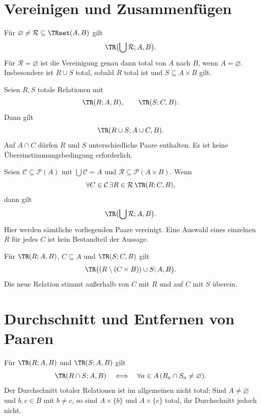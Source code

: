 \section{Vereinigen und Zusammenfügen}

\begin{theorem}
\label{b04guide:thm:union}
Für $\varnothing\ne\mathcal R\subseteq\TRset(A,B)$ gilt
\[
 \TR\bigl(\bigcup\mathcal R;A,B\bigr).
\]
Für $\mathcal R=\varnothing$ ist die Vereinigung genau dann
total von $A$ nach $B$, wenn $A=\varnothing$.
Insbesondere ist $R\cup S$ total, sobald $R$ total ist und
$S\subseteq A\times B$ gilt.
\end{theorem}

\begin{theorem}
\label{b04guide:thm:gluing}
Seien $R,S$ totale Relationen mit
\[
 \TR(R;A,B),\qquad \TR(S;C,B).
\]
Dann gilt
\[
 \TR(R\cup S;A\cup C,B).
\]
Auf $A\cap C$ dürfen $R$ und $S$ unterschiedliche Paare enthalten.
Es ist keine Übereinstimmungsbedingung erforderlich.
\end{theorem}

\begin{theorem}
\label{b04guide:thm:familyglue}
Seien $\mathcal C\subseteq\mathcal P(A)$ mit
$\bigcup\mathcal C=A$ und
$\mathcal R\subseteq\mathcal P(A\times B)$.
Wenn
\[
 \forall C\in\mathcal C\,\exists R\in\mathcal R\,
                  \TR(R;C,B),
\]
dann gilt
\[
 \TR\bigl(\bigcup\mathcal R;A,B\bigr).
\]
Hier werden sämtliche vorliegenden Paare vereinigt.
Eine Auswahl eines einzelnen $R$ für jedes $C$ ist kein
Bestandteil der Aussage.
\end{theorem}

\begin{theorem}
\label{b04guide:thm:override}
Für $\TR(R;A,B)$, $C\subseteq A$ und $\TR(S;C,B)$ gilt
\[
 \TR\bigl((R\setminus(C\times B))\cup S;A,B\bigr).
\]
Die neue Relation stimmt außerhalb von $C$ mit $R$ und
auf $C$ mit $S$ überein.
\end{theorem}

\section{Durchschnitt und Entfernen von Paaren}

\begin{theorem}
\label{b04guide:thm:intersection}
Für $\TR(R;A,B)$ und $\TR(S;A,B)$ gilt
\[
 \TR(R\cap S;A,B)
 \quad\Longleftrightarrow\quad
 \forall a\in A\,(R_a\cap S_a\ne\varnothing).
\]
Der Durchschnitt totaler Relationen ist im allgemeinen nicht
total: Sind $A\ne\varnothing$ und $b,c\in B$ mit $b\ne c$,
so sind $A\times\{b\}$ und $A\times\{c\}$ total,
ihr Durchschnitt jedoch nicht.
\end{theorem}

